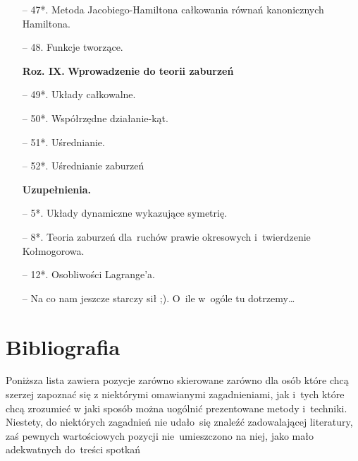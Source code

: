\documentclass[a4paper,11pt]{article}
\begin{document}
\begin{itemize}
\item[--] 47*. Metoda Jacobiego-Hamiltona całkowania równań
  kanonicznych Hamiltona.

\item[--] 48. Funkcje tworzące.


\item[\textbf{Roz. IX.}] \textbf{Wprowadzenie do teorii zaburzeń}

\item[--] 49*. Układy całkowalne.

\item[--] 50*. Współrzędne działanie-kąt.

\item[--] 51*. Uśrednianie.

\item[--] 52*. Uśrednianie zaburzeń


\item[] \textbf{Uzupełnienia.}

\item[--] 5*. Układy dynamiczne wykazujące symetrię.

\item[--] 8*. Teoria zaburzeń dla~ruchów prawie okresowych
  i~twierdzenie Kołmogorowa.

\item[--] 12*. Osobliwości Lagrange'a.

\item[--] Na co nam jeszcze starczy sił ;). O~ile w~ogóle tu
  dotrzemy\ldots

\end{itemize}










\section{Bibliografia}


\noindent
Poniższa lista zawiera pozycje zarówno skierowane zarówno dla osób
które chcą szerzej zapoznać się z niektórymi omawianymi zagadnieniami, jak
i~tych które chcą zrozumieć w jaki sposób można uogólnić prezentowane metody i~techniki. Niestety, do niektórych zagadnień nie
udało~się znaleźć zadowalającej literatury, zaś pewnych wartościowych pozycji nie~umieszczono na niej, jako mało adekwatnych
do~treści spotkań
\end{document}
